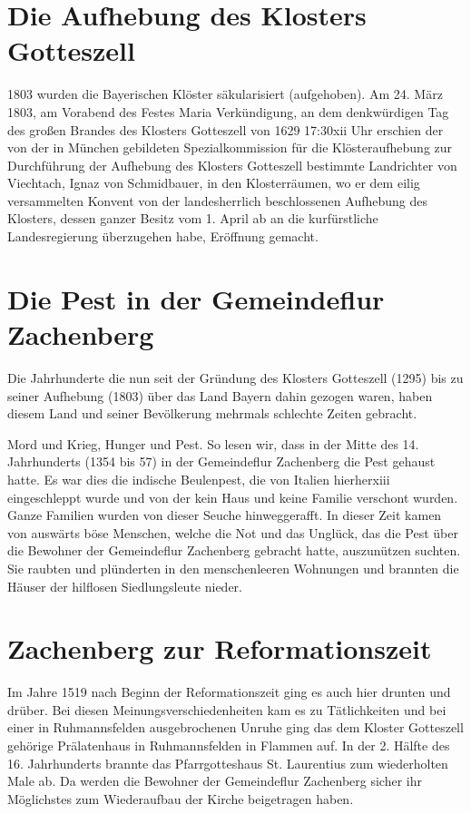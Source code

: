 \documentclass[12pt,a4pager]{book}
\begin{document}
\section{Die Aufhebung des Klosters Gotteszell}

1803 wurden die Bayerischen Klöster säkularisiert (aufgehoben). Am 24. März
1803, am Vorabend des Festes Maria Verkündigung, an dem denkwürdigen Tag des
großen Brandes des Klosters Gotteszell von 1629 17:30xii Uhr erschien der von
der in München gebildeten Spezialkommission für die Klösteraufhebung zur
Durchführung der Aufhebung des Klosters Gotteszell bestimmte Landrichter von
Viechtach, Ignaz von Schmidbauer, in den Klosterräumen, wo er dem eilig
versammelten Konvent von der landesherrlich beschlossenen Aufhebung des
Klosters, dessen ganzer Besitz vom 1. April ab an die kurfürstliche
Landesregierung überzugehen habe, Eröffnung gemacht.

\section{Die Pest in der Gemeindeflur Zachenberg}

Die Jahrhunderte die nun seit der Gründung des Klosters Gotteszell (1295) bis zu
seiner Aufhebung (1803) über das Land Bayern dahin gezogen waren, haben diesem
Land und seiner Bevölkerung mehrmals schlechte Zeiten gebracht.

Mord und Krieg, Hunger und Pest. So lesen wir, dass in der Mitte des 14.
Jahrhunderts (1354 bis 57) in der Gemeindeflur Zachenberg die Pest gehaust
hatte. Es war dies die indische Beulenpest, die von Italien hierherxiii
eingeschleppt wurde und von der kein Haus und keine Familie verschont wurden.
Ganze Familien wurden von dieser Seuche hinweggerafft. In dieser Zeit kamen von
auswärts böse Menschen, welche die Not und das Unglück, das die Pest über die
Bewohner der Gemeindeflur Zachenberg gebracht hatte, auszunützen suchten. Sie
raubten und plünderten in den menschenleeren Wohnungen und brannten die Häuser
der hilflosen Siedlungsleute nieder.

\section{Zachenberg zur Reformationszeit}

Im Jahre 1519 nach Beginn der Reformationszeit ging es auch hier drunten und
drüber. Bei diesen Meinungsverschiedenheiten kam es zu Tätlichkeiten und bei
einer in Ruhmannsfelden ausgebrochenen Unruhe ging das dem Kloster Gotteszell
gehörige Prälatenhaus in Ruhmannsfelden in Flammen auf. In der 2. Hälfte des 16.
Jahrhunderts brannte das Pfarrgotteshaus St. Laurentius zum wiederholten Male
ab. Da werden die Bewohner der Gemeindeflur Zachenberg sicher ihr Möglichstes
zum Wiederaufbau der Kirche beigetragen haben.
\end{document}
